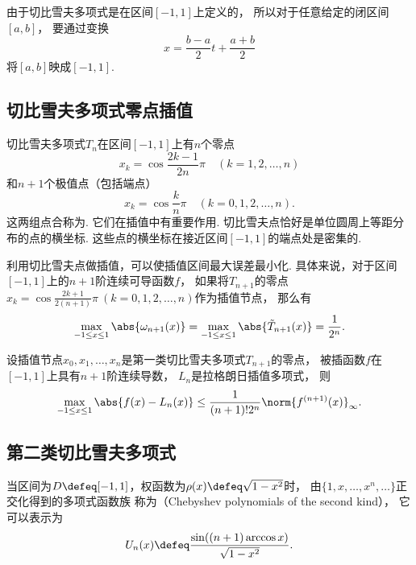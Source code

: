 由于切比雪夫多项式是在区间\([-1,1]\)上定义的，
所以对于任意给定的闭区间\([a,b]\)，
要通过变换\begin{equation*}
	x = \frac{b-a}{2} t + \frac{a+b}{2}
\end{equation*}
将\([a,b]\)映成\([-1,1]\).

\subsection{切比雪夫多项式零点插值}
切比雪夫多项式\(T_n\)在区间\([-1,1]\)上有\(n\)个零点\begin{equation*}
	x_k = \cos\frac{2k-1}{2n}\pi
	\quad(k=1,2,\dotsc,n)
\end{equation*}
和\(n+1\)个极值点（包括端点）\begin{equation*}
	x_k = \cos\frac{k}{n}\pi
	\quad(k=0,1,2,\dotsc,n).
\end{equation*}
这两组点合称为.
它们在插值中有重要作用.
切比雪夫点恰好是单位圆周上等距分布的点的横坐标.
这些点的横坐标在接近区间\([-1,1]\)的端点处是密集的.

利用切比雪夫点做插值，可以使插值区间最大误差最小化.
具体来说，对于区间\([-1,1]\)上的\(n+1\)阶连续可导函数\(f\)，
如果将\(T_{n+1}\)的零点\(
	x_k = \cos\frac{2k+1}{2(n+1)}\pi
	\ (k=0,1,2,\dotsc,n)
\)作为插值节点，
那么有\begin{equation*}
	\max_{-1 \leq x \leq 1} \abs{\omega_{n+1}(x)}
	= \max_{-1 \leq x \leq 1} \abs{\tilde{T}_{n+1}(x)}
	= \frac1{2^n}.
\end{equation*}

\begin{theorem}
设插值节点\(x_0,x_1,\dotsc,x_n\)是第一类切比雪夫多项式\(T_{n+1}\)的零点，
被插函数\(f\)在\([-1,1]\)上具有\(n+1\)阶连续导数，
\(L_n\)是拉格朗日插值多项式，
则\begin{equation*}
	\max_{-1 \leq x \leq 1} \abs{f(x) - L_n(x)}
	\leq \frac{1}{(n+1)! 2^n} \norm{f^{(n+1)}(x)}_\infty.
\end{equation*}
\end{theorem}

\subsection{第二类切比雪夫多项式}
当区间为\(D \defeq [-1,1]\)，权函数为\(\rho(x) \defeq \sqrt{1-x^2}\)时，
由\(\{1,x,\dotsc,x^n,\dotsc\}\)正交化得到的多项式函数族
称为（Chebyshev polynomials of the second kind），
它可以表示为\begin{equation}
	U_n(x)
	\defeq
	\frac{\sin((n+1) \arccos x)}{\sqrt{1-x^2}}.
\end{equation}

